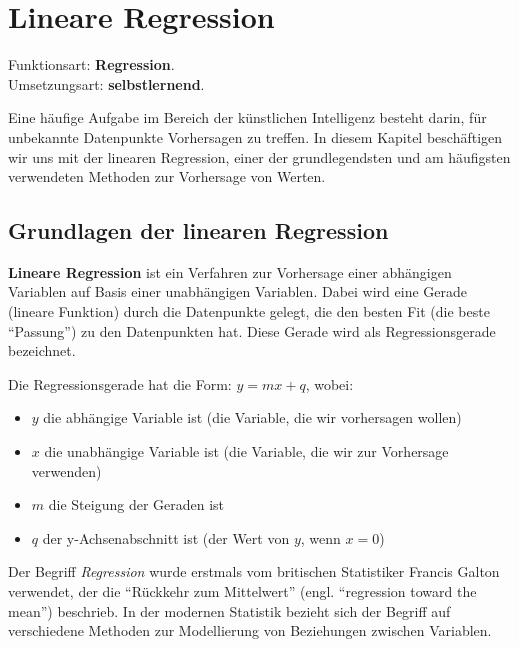 \chapter{Lineare Regression}
\label{chap:regression}

\begin{myremark}
Funktionsart: \textbf{Regression}. \\
Umsetzungsart: \textbf{selbstlernend}.
\end{myremark}

Eine häufige Aufgabe im Bereich der künstlichen Intelligenz besteht darin, für unbekannte Datenpunkte Vorhersagen zu treffen. In diesem Kapitel beschäftigen wir uns mit der linearen Regression, einer der grundlegendsten und am häufigsten verwendeten Methoden zur Vorhersage von Werten.

\section{Grundlagen der linearen Regression}

\begin{mydefinition}
\textbf{Lineare Regression} ist ein Verfahren zur Vorhersage einer abhängigen Variablen auf Basis einer unabhängigen Variablen. Dabei wird eine Gerade (lineare Funktion) durch die Datenpunkte gelegt, die den besten Fit (die beste \enquote{Passung}) zu den Datenpunkten hat. Diese Gerade wird als Regressionsgerade bezeichnet.

Die Regressionsgerade hat die Form: $y = mx + q$, wobei:
\begin{itemize}
	\item $y$ die abhängige Variable ist (die Variable, die wir vorhersagen wollen)
	\item $x$ die unabhängige Variable ist (die Variable, die wir zur Vorhersage verwenden)
	\item $m$ die Steigung der Geraden ist
	\item $q$ der y-Achsenabschnitt ist (der Wert von $y$, wenn $x = 0$)
\end{itemize}

Der Begriff \textit{Regression} wurde erstmals vom britischen Statistiker Francis Galton verwendet, der die \enquote{Rückkehr zum Mittelwert} (engl. \enquote{regression toward the mean}) beschrieb. In der modernen Statistik bezieht sich der Begriff auf verschiedene Methoden zur Modellierung von Beziehungen zwischen Variablen.
\end{mydefinition}

